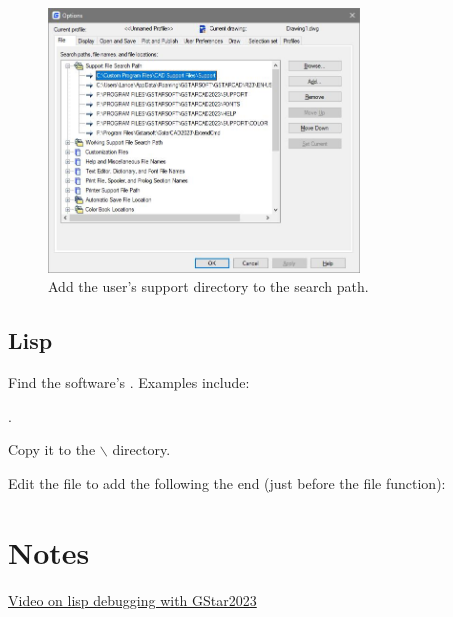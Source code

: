 \documentclass{lebook}
\newcommand{\tbs}{$\backslash$}
\newcommand*{\supportdir}{\textcode{\textit{support}}}
\newcommand*{\supportpath}{\supportdir\tbs}
\begin{document}
\begin{figure}
	\centering
	\includegraphics[width=3.25in]{addsupportdirectory}
	\caption{Add the user's support directory to the search path.}
	\label{fig:addsupportdirectory}
\end{figure}


\section{Lisp}
\begin{numberedlist}
    \item Find the software's .  Examples include:
    \begin{bulletedlist}
    	\item {}
    	\item {}.
    \end{bulletedlist}
    \item Copy it to the \supportpath{} directory.
    \item Edit the file to add the following the end (just before the file  function):
    \begin{plainlist}
    	\item {}
		\item {}
    \end{plainlist}

\end{numberedlist}




\chapter{Notes}
\begin{bulletedlist}
	\item \href{https://www.youtube.com/watch?v=Rrgx3TcXNzM}{Video on lisp debugging with GStar2023}
\end{bulletedlist}
\end{document}
